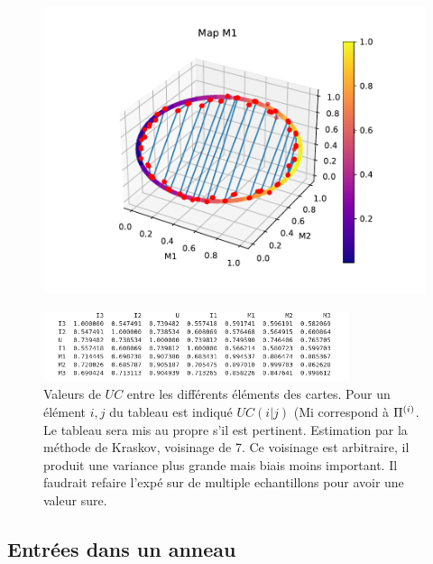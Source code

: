 \begin{figure}[h!]
\begin{minipage}{0.33\textwidth}
\end{minipage}
\begin{minipage}{0.33\textwidth}
\includegraphics[width=\textwidth]{3som_cercle_din1}
\end{minipage}
\end{figure}
\begin{figure}
\centering\includegraphics[width=0.8\textwidth]{3som_cercle_im}
\caption{Valeurs de $UC$ entre les différents éléments des cartes. Pour un élément $i,j$ du tableau est indiqué $UC(i|j)$ (Mi correspond à $\Pi^{({i})}$. Le tableau sera mis au propre s'il est pertinent. Estimation par la méthode de Kraskov, voisinage de 7. Ce voisinage est arbitraire, il produit une variance plus grande mais biais moins important. Il faudrait refaire l'expé sur de multiple echantillons pour avoir une valeur sure. }
\label{fig:3som_cercle}
\end{figure}



\subsection{Entrées dans un anneau}

